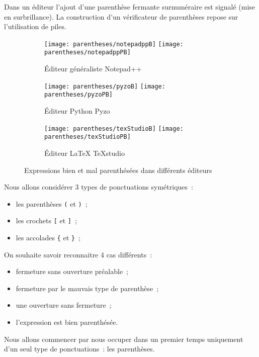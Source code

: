 Dans un éditeur l'ajout d'une parenthèse fermante surnuméraire est signalé (mise en surbrillance). La construction d'un vérificateur de parenthèses repose sur l'utilisation de piles.

\begin{figure}[hbt]
	\begin{center}
		\begin{subfigure}[t]{0.32\textwidth}
			\centering
			\texttt{[image: parentheses/notepadppB]}
			\texttt{[image: parentheses/notepadppPB]}
			\caption{Éditeur généraliste Notepad++}
		\end{subfigure}
		\hfill
		\begin{subfigure}[t]{0.32\textwidth}
			\centering
			\texttt{[image: parentheses/pyzoB]}
			\texttt{[image: parentheses/pyzoPB]}
			\caption{Éditeur Python Pyzo}
		\end{subfigure}
		\hfill
		\begin{subfigure}[t]{0.32\textwidth}
			\centering
			\texttt{[image: parentheses/texStudioB]}
			\texttt{[image: parentheses/texStudioPB]}
			\caption{Éditeur \LaTeX{} TeXstudio}
		\end{subfigure}
		\caption{Expressions bien et mal parenthésées dans différents éditeurs}
	\end{center}
\end{figure}

Nous allons considérer 3 types de ponctuations symétriques~: 
\begin{itemize}
	\item les parenthèses \texttt{(} et \texttt{)}~; 
	\item les crochets \texttt{[} et \texttt{]}~; 
	\item les accolades \texttt{\{} et \texttt{\}}~; 
\end{itemize}

On souhaite savoir reconnaitre 4 cas différents~: 
\begin{itemize}
	\item fermeture sans ouverture préalable~; 
	\item fermeture par le mauvais type de parenthèse~; 
	\item une ouverture sans fermeture~; 
	\item l'expression est bien parenthésée. 
\end{itemize}

Nous allons commencer par nous occuper dans un premier temps uniquement d'un seul type de ponctuations~: les parenthèses. 

